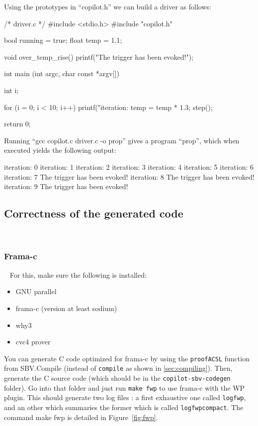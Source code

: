 Using the prototypes in ``copilot.h'' we can build a driver as follows:

\begin{code}
/* driver.c */
#include <stdio.h>
#include "copilot.h"

bool running = true;
float temp = 1.1;

void over_temp_rise()
{
  printf("The trigger has been evoked!\n");
}

int main (int argc, char const *argv[])
{
  int i;

  for (i = 0; i < 10; i++)
  {
    printf("iteration: %
    temp = temp * 1.3;
    step();
  }

  return 0;
}
\end{code}

Running ``gcc copilot.c driver.c -o prop'' gives a program ``prop'', which when executed
yields the following output:
%
\begin{code}
iteration: 0
iteration: 1
iteration: 2
iteration: 3
iteration: 4
iteration: 5
iteration: 6
iteration: 7
The trigger has been evoked!
iteration: 8
The trigger has been evoked!
iteration: 9
The trigger has been evoked!
\end{code}
%

\subsection{Correctness of the generated code}~\label{sec:correctness} 

\subsubsection{Frama-c}~\label{subsec:frama-c} 
For this, make sure the following is installed:

\begin{itemize}
	\item GNU parallel
	\item frama-c (version at least sodium)
	\item why3 
	\item cvc4 prover
\end{itemize}

You can generate C code optimized for frama-c by using the \texttt{proofACSL} function from SBV.Compile (instead of \texttt{compile} as shown in \ref{sec:compiling}). 
Then, generate the C source code (which should be in the \texttt{copilot-sbv-codegen} folder). Go into that folder and just run \texttt{make fwp} to use frama-c with the WP plugin. This should generate two log files : a first exhaustive one called \texttt{logfwp}, and an other which summaries the former which is called \texttt{logfwpcompact}. The command make fwp is detailed in Figure~\ref{fig:fwp}.

